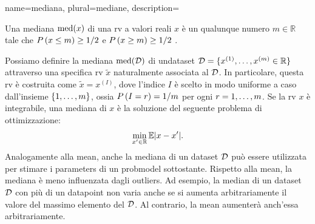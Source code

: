 {name={mediana}, 
 plural={mediane},
 description={Una mediana $\mathrm{med}(x)$ di una \gls{rv} a valori reali $x$ 
 è un qualunque numero $m \in \mathbb{R}$ tale che $P\left( x \leq m\right) \geq 1/2$ e $P\left( x \geq m\right) \geq 1/2$ \cite{LC}. 
 \begin{figure}
	\begin{center}
\end{center}
 \end{figure}  
 Possiamo definire la mediana $\mathrm{med}(\mathcal{D})$ 
 di un\gls{dataset} $\mathcal{D} = \{ x^{(1)}, \ldots, x^{(m)} \in \mathbb{R} \}$ 
 attraverso una specifica \gls{rv} $\tilde{x}$ naturalmente associata al $\mathcal{D}$. 
 In particolare, questa \gls{rv} è costruita come $\tilde{x} = x^{(I)}$, dove l'indice $I$ 
 è scelto in modo uniforme a caso dall’insieme $\{1,\ldots,m\}$, ossia $P\left(I = r\right)=1/m$ per 
 ogni $r=1,\ldots,m$. Se la \gls{rv} $x$ è integrabile, una mediana di $x$ 
 è la soluzione del seguente problema di ottimizzazione:
  $$\min_{x' \in \mathbb{R}} \mathbb{E}{|x - x'|}.$$ 
 Analogamente alla \gls{mean}, anche la mediana di un \gls{dataset} $\mathcal{D}$ può essere utilizzata
 per stimare i \glspl{parameter} di un \gls{probmodel} sottostante. Rispetto 
 alla \gls{mean}, la mediana è meno influenzata dagli \glspl{outlier}. Ad esempio, 
 la median di un \gls{dataset} $\mathcal{D}$ con più di un \gls{datapoint} non varia 
 anche se si aumenta arbitrariamente il valore del massimo elemento del $\mathcal{D}$. Al contrario, 
 la \gls{mean} aumenterà anch’essa arbitrariamente.
}}
